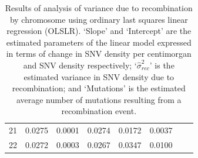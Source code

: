 \documentclass[12pt]{article}%
\begin{document}
\begin{table}[htp!]
\begin{tabular}{ c c c c c c c c }
 21 &      0.0275 & 0.0001 &    0.0274 &                  0.0172 &    0.0037 \\
 22 &      0.0272 & 0.0003 &    0.0267 &                  0.0347 &    0.0100 \\
\hline
\end{tabular}
\caption{Results of analysis of variance due to recombination by chromosome using ordinary last squares linear regression (OLSLR). `Slope' and `Intercept' are the estimated parameters of the linear model expressed in terms of change in SNV density per centimorgan and SNV density respectively; `$\hat{\sigma }^2_{rec}$' is the estimated variance in SNV density due to recombination; and `Mutations' is the estimated average number of mutations resulting from a recombination event. }
\label{tab:supp-OLSLR}
\end{table}

\newpage
\end{document}
